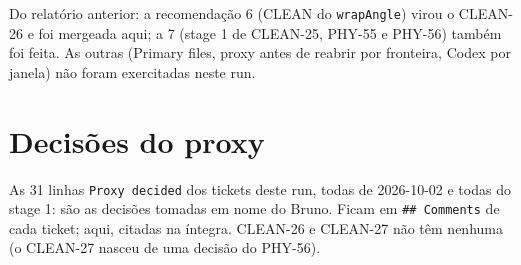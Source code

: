\documentclass[11pt,a4paper]{article}
\begin{document}
Do relatório anterior: a recomendação 6 (CLEAN do \texttt{wrapAngle}) virou o
CLEAN-26 e foi mergeada aqui; a 7 (stage 1 de CLEAN-25, PHY-55 e PHY-56)
também foi feita. As outras (Primary files, proxy antes de reabrir por
fronteira, Codex por janela) não foram exercitadas neste run.

\section{Decisões do proxy}

As 31 linhas \texttt{Proxy decided} dos tickets deste run, todas de 2026-10-02 e
todas do stage 1: são as decisões tomadas em nome do Bruno. Ficam em
\texttt{\#\# Comments} de cada ticket; aqui, citadas na íntegra. CLEAN-26 e
CLEAN-27 não têm nenhuma (o CLEAN-27 nasceu de uma decisão do PHY-56).
\end{document}
